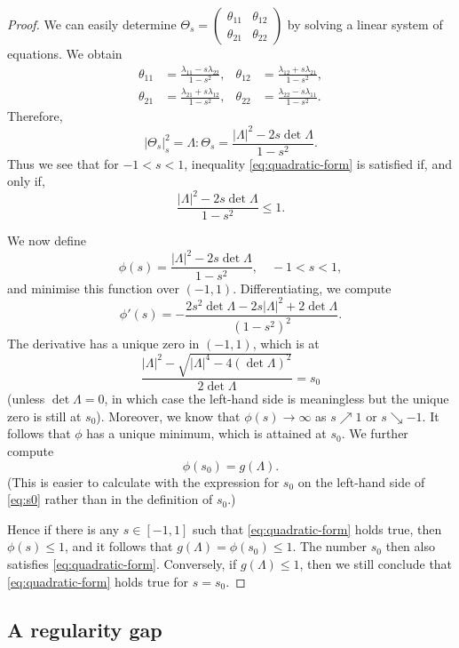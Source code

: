 \documentclass[a4paper]{article}
\theoremstyle{definition}
\theoremstyle{remark}
\begin{document}
\begin{proof}
We can easily determine $\Theta_s = (\begin{smallmatrix} \theta_{11} & \theta_{12} \\ \theta_{21} & \theta_{22} \end{smallmatrix})$ by solving a linear system of equations.
We obtain
\begin{align*}
\theta_{11} & = \frac{\lambda_{11} - s\lambda_{22}}{1 - s^2}, &
\theta_{12} & = \frac{\lambda_{12} + s\lambda_{21}}{1 - s^2}, \\
\theta_{21} & = \frac{\lambda_{21} + s\lambda_{12}}{1 - s^2}, &
\theta_{22} & = \frac{\lambda_{22} - s\lambda_{11}}{1 - s^2}. 
\end{align*}
Therefore,
\[
|\Theta_s|_s^2 = \Lambda : \Theta_s = \frac{|\Lambda|^2 - 2 s \det \Lambda}{1 - s^2}.
\]
Thus we see that for $-1 < s < 1$, inequality
\eqref{eq:quadratic-form} is satisfied if, and only if,
\[
\frac{|\Lambda|^2 - 2 s \det \Lambda}{1 - s^2} \le 1.
\]

We now define
\[
\phi(s) = \frac{|\Lambda|^2 - 2 s \det \Lambda}{1 - s^2}, \quad -1 < s < 1,
\]
and minimise this function over $(-1, 1)$. Differentiating, we compute
\[
\phi'(s) = - \frac{2s^2 \det \Lambda - 2s|\Lambda|^2 + 2\det \Lambda}{(1 - s^2)^2}.
\]
The derivative has a unique zero in $(-1, 1)$, which is at
\begin{equation} \label{eq:s0}
\frac{|\Lambda|^2 - \sqrt{|\Lambda|^4 - 4(\det \Lambda)^2}}{2 \det \Lambda} = s_0
\end{equation}
(unless $\det \Lambda = 0$, in which case the left-hand side is meaningless
but the unique zero is still at $s_0$).
Moreover, we know that $\phi(s) \to \infty$ as $s \nearrow 1$ or $s \searrow -1$.
It follows that $\phi$ has a unique minimum, which is attained at $s_0$. We further compute
\[
\phi(s_0) = g(\Lambda).
\]
(This is easier to calculate with the expression for $s_0$ on the left-hand
side of \eqref{eq:s0} rather than in the definition of $s_0$.)

Hence if there is any $s \in [-1, 1]$
such that \eqref{eq:quadratic-form} holds true, then $\phi(s) \le 1$,
and it follows that $g(\Lambda) = \phi(s_0) \le 1$. The number $s_0$ then
also satisfies \eqref{eq:quadratic-form}. Conversely, if $g(\Lambda) \le 1$,
then we still conclude that \eqref{eq:quadratic-form} holds true for
$s = s_0$.
\end{proof}



\subsection{A regularity gap}
\end{document}
